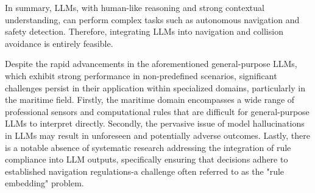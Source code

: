 In summary, LLMs, with human-like reasoning and strong contextual understanding, can perform complex tasks such as autonomous navigation and safety detection. Therefore, integrating LLMs into navigation and collision avoidance is entirely feasible. 

Despite the rapid advancements in the aforementioned general-purpose LLMs, which exhibit strong performance in non-predefined scenarios, significant challenges persist in their application within specialized domains, particularly in the maritime field. Firstly, the maritime domain encompasses a wide range of professional sensors and computational rules that are difficult for general-purpose LLMs to interpret directly. Secondly, the pervasive issue of model hallucinations in LLMs may result in unforeseen and potentially adverse outcomes. Lastly, there is a notable absence of systematic research addressing the integration of rule compliance into LLM outputs, specifically ensuring that decisions adhere to established navigation regulations-a challenge often referred to as the "rule embedding" problem.